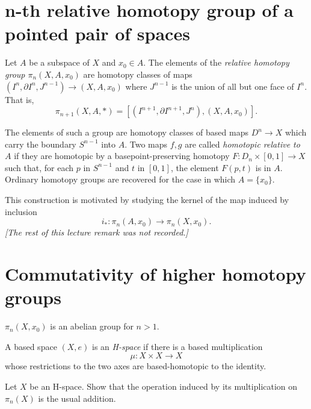 \section{n-th relative
homotopy group of
a pointed pair of spaces}
\label{section-relative-homotopy-group}

\noindent
Let $A$ be a subspace of $X$ and $x_0\in A$.
The elements of the {\it relative homotopy
group $\pi_n(X,A,x_0)$}
are homotopy classes of maps $(I^n,\partial
I^n,J^{n-1})\to (X,A,x_0)$
where $J^{n-1}$ is the union of all but one
face of $I^n$.
That is,
$$
\pi_{n+1}(X,A,*)=[(I^{n+1},\partial
I^{n+1},J^n),(X,A,x_0)].
$$

The elements of such a group are homotopy
classes of based maps
$D^n\to X$ which carry the boundary $S^{n-1}$
into $A$.
Two maps $f,g$ are called {\it homotopic
relative to $A$}
if they are homotopic by a
basepoint-preserving homotopy
 $F:D_n\times[0,1]\to X$ such that, for each
 $p$ in $S^{n-1}$ and $t$ in $[0,1]$,
the element $F(p,t)$ is in $A$. Ordinary
homotopy groups are
recovered for the case in which $A=\{x_0\}$.

\begin{remark}
\label{remark-relative-homotopy}
This construction is motivated by studying the kernel of the
map induced by inclusion
\[
i_*:\pi_n(A,x_0)\longrightarrow\pi_n(X,x_0).
\]
\emph{[The rest of this lecture remark was not recorded.]}
\end{remark}

\section{Commutativity of higher homotopy
groups}
\label{section-commu-highe-homot-group}

\begin{proposition}
\label{proposition-commu-highe-homot-group}
$\pi_n(X,x_0)$ is an abelian group for $n>1$.
\end{proposition}

\begin{definition}
\label{at-definition-h-space}
A based space $(X,e)$ is an \emph{H-space}
if there is a based multiplication
$$
\mu:X\times X\longrightarrow X
$$
whose restrictions to the two axes are
based-homotopic to the identity.
\end{definition}

\begin{exercise}
Let $X$ be an H-space. Show that the
operation induced by its multiplication on
$\pi_n(X)$ is the usual addition.
\end{exercise}

